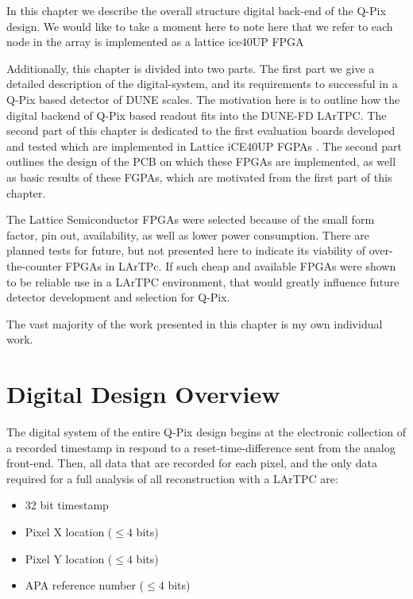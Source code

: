 In this chapter we describe the overall structure digital back-end of the Q-Pix design.
We would like to take a moment here to note here that we refer to each node in the array is implemented as a lattice ice40UP FPGA 

Additionally, this chapter is divided into two parts. 
The first part we give a detailed description of the digital-system, and its requirements to successful in a Q-Pix based detector of DUNE scales.
The motivation here is to outline how the digital backend of Q-Pix based readout fits into the DUNE-FD LArTPC. 
The second part of this chapter is dedicated to the first evaluation boards developed and tested which are implemented in Lattice iCE40UP FGPAs \citep{lattice_ice40up_datasheet}.
The second part outlines the design of the PCB on which these FPGAs are implemented, as well as basic results of these FGPAs, which are motivated from the first part of this chapter.

The Lattice Semiconductor FPGAs \citep{lattice_ice40up_datasheet} were selected because of the small form factor, pin out, availability, as well as lower power consumption.
There are planned tests for future, but not presented here to indicate its viability of over-the-counter FPGAs in LArTPc. 
If such cheap and available FPGAs were shown to be reliable use in a LArTPC environment, that would greatly influence future detector development and selection for Q-Pix.

The vast majority of the work presented in this chapter is my own individual work.

\section{Digital Design Overview}

The digital system of the entire Q-Pix design begins at the electronic collection of a recorded timestamp in respond to a reset-time-difference sent from the analog front-end.
Then, all data that are recorded for each pixel, and the only data required for a full analysis of all reconstruction with a LArTPC are:

\begin{itemize}
    \item 32 bit timestamp
    \item Pixel X location ($\le 4$ bits)
    \item Pixel Y location ($\le 4$ bits)
    \item APA reference number ($\le 4$ bits)
\end{itemize}
\label{bit_calc}

